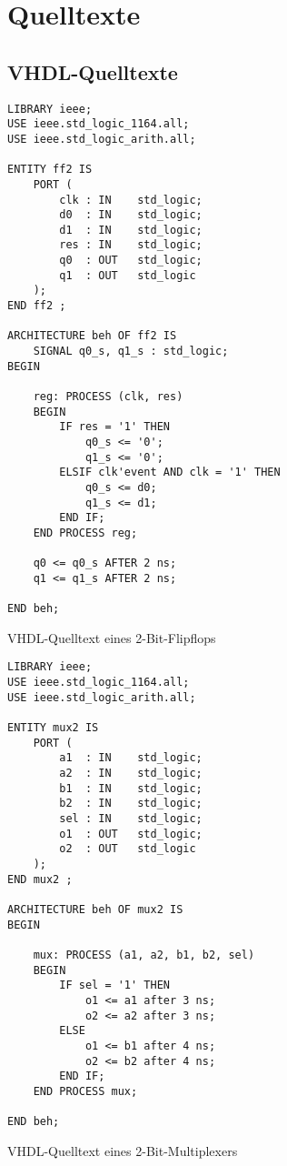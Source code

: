 \chapter{Quelltexte}

\section{VHDL-Quelltexte}\label{anhang:source:vhdl}

\begin{code}
    \begin{verbatim}
LIBRARY ieee;
USE ieee.std_logic_1164.all;
USE ieee.std_logic_arith.all;

ENTITY ff2 IS
    PORT (
        clk : IN    std_logic;
        d0  : IN    std_logic;
        d1  : IN    std_logic;
        res : IN    std_logic;
        q0  : OUT   std_logic;
        q1  : OUT   std_logic
    );
END ff2 ;

ARCHITECTURE beh OF ff2 IS
    SIGNAL q0_s, q1_s : std_logic;
BEGIN
    
    reg: PROCESS (clk, res)
    BEGIN
        IF res = '1' THEN
            q0_s <= '0';
            q1_s <= '0';
        ELSIF clk'event AND clk = '1' THEN
            q0_s <= d0;
            q1_s <= d1;
        END IF;
    END PROCESS reg;

    q0 <= q0_s AFTER 2 ns;
    q1 <= q1_s AFTER 2 ns;

END beh;
    \end{verbatim}
    \caption[VHDL-Quelltext eines 2-Bit-Flipflops]
            {VHDL-Quelltext eines 2-Bit-Flipflops \cite[siehe][39]{kesel2013}}
\end{code}

\begin{code}
    \begin{verbatim}
LIBRARY ieee;
USE ieee.std_logic_1164.all;
USE ieee.std_logic_arith.all;

ENTITY mux2 IS
    PORT (
        a1  : IN    std_logic;
        a2  : IN    std_logic;
        b1  : IN    std_logic;
        b2  : IN    std_logic;
        sel : IN    std_logic;
        o1  : OUT   std_logic;
        o2  : OUT   std_logic
    );
END mux2 ;

ARCHITECTURE beh OF mux2 IS
BEGIN

    mux: PROCESS (a1, a2, b1, b2, sel)
    BEGIN
        IF sel = '1' THEN
            o1 <= a1 after 3 ns;
            o2 <= a2 after 3 ns;
        ELSE
            o1 <= b1 after 4 ns;
            o2 <= b2 after 4 ns;
        END IF;
    END PROCESS mux;

END beh;
    \end{verbatim}
    \caption[VHDL-Quelltext eines 2-Bit-Multiplexers]
            {VHDL-Quelltext eines 2-Bit-Multiplexers \cite[siehe][39--40]{kesel2013}}
\end{code}

